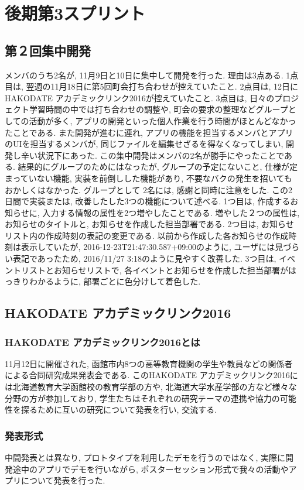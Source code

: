 \section{後期第3スプリント}
\subsection{第２回集中開発}
メンバのうち2名が, 11月9日と10日に集中して開発を行った. 理由は3点ある. 1点目は, 翌週の11月18日に第5回町会打ち合わせが控えていたこと.
2点目は, 12日にHAKODATE アカデミックリンク2016が控えていたこと. 3点目は, 日々のプロジェクト学習時間の中では打ち合わせの調整や, 町会の要求の整理などグループとしての活動が多く,
アプリの開発といった個人作業を行う時間がほとんどなかったことである. また開発が進むに連れ, アプリの機能を担当するメンバとアプリのUIを担当するメンバが, 同じファイルを編集せざるを得なくなってしまい,
開発し辛い状況下にあった. この集中開発はメンバの2名が勝手にやったことである. 結果的にグループのためにはなったが, グループの予定にないこと, 仕様が定まっていない機能, 実装を前倒しした機能があり,
不要なバクの発生を招いてもおかしくはなかった. グループとして 2名には, 感謝と同時に注意をした. この2日間で実装または, 改善したした3つの機能について述べる. 1つ目は, 作成するお知らせに,
入力する情報の属性を2つ増やしたことである. 増やした２つの属性は, お知らせのタイトルと, お知らせを作成した担当部署である. 2つ目は, お知らせリスト内の作成時刻の表記の変更である.
以前から作成した各お知らせの作成時刻は表示していたが, 2016-12-23T21:47:30.587+09:00のように, ユーザには見づらい表記であったため, 2016/11/27 3:18のように見やすく改善した.
3つ目は, イベントリストとお知らせリストで, 各イベントとお知らせを作成した担当部署がはっきりわかるように, 部署ごとに色分けして着色した.

\subsection{HAKODATE アカデミックリンク2016}
\subsubsection{HAKODATE アカデミックリンク2016とは}
11月12日に開催された, 函館市内8つの高等教育機関の学生や教員などの関係者による合同研究成果発表会である.
このHAKODATE アカデミックリンク2016には北海道教育大学函館校の教育学部の方や, 北海道大学水産学部の方など様々な分野の方が参加しており,
学生たちはそれぞれの研究テーマの連携や協力の可能性を探るために互いの研究について発表を行い, 交流する.
\subsubsection{発表形式}
中間発表とは異なり, プロトタイプを利用したデモを行うのではなく, 実際に開発途中のアプリでデモを行いながら, ポスターセッション形式で我々の活動やアプリについて発表を行った.
